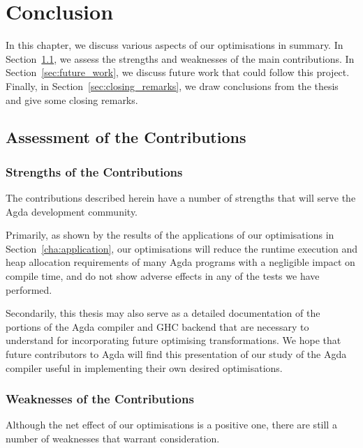 \chapter{Conclusion}
\label{cha:conclusion}

In this chapter, we discuss various aspects of our optimisations in summary. In Section~\ref{sec:assessment_of_the_contributions}, we assess the strengths and weaknesses of the main contributions. In Section~\ref{sec:future_work}, we discuss future work that could follow this project. Finally, in Section~\ref{sec:closing_remarks}, we draw conclusions from the thesis and give some closing remarks.

\section{Assessment of the Contributions}
\label{sec:assessment_of_the_contributions}

\subsection{Strengths of the Contributions}
\label{sub:strengths_of_the_contributions}

The contributions described herein have a number of strengths that will serve the Agda development community.

Primarily, as shown by the results of the applications of our optimisations in Section~\ref{cha:application}, our optimisations will reduce the runtime execution and heap allocation requirements of many Agda programs with a negligible impact on compile time, and do not show adverse effects in any of the tests we have performed.

Secondarily, this thesis may also serve as a detailed documentation of the portions of the Agda compiler and GHC backend that are necessary to understand for incorporating future optimising transformations. We hope that future contributors to Agda will find this presentation of our study of the Agda compiler useful in implementing their own desired optimisations.

\subsection{Weaknesses of the Contributions}
\label{sub:weaknesses_of_the_contributions}

Although the net effect of our optimisations is a positive one, there are still a number of weaknesses that warrant consideration.

